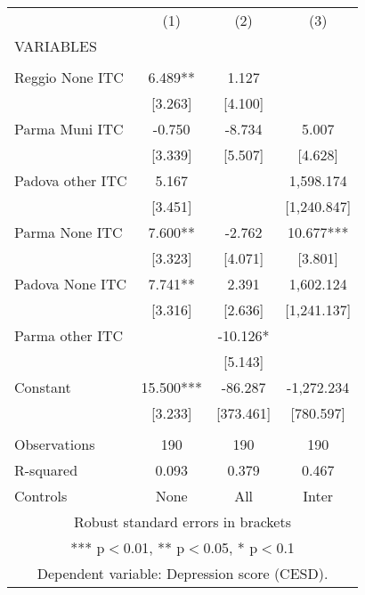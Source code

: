 \begin{tabular}{lccc} \hline
 & (1) & (2) & (3) \\
VARIABLES &  &  &  \\ \hline
 &  &  &  \\
Reggio None ITC & 6.489** & 1.127 &  \\
 & [3.263] & [4.100] &  \\
Parma Muni ITC & -0.750 & -8.734 & 5.007 \\
 & [3.339] & [5.507] & [4.628] \\
Padova other ITC & 5.167 &  & 1,598.174 \\
 & [3.451] &  & [1,240.847] \\
Parma None ITC & 7.600** & -2.762 & 10.677*** \\
 & [3.323] & [4.071] & [3.801] \\
Padova None ITC & 7.741** & 2.391 & 1,602.124 \\
 & [3.316] & [2.636] & [1,241.137] \\
Parma other ITC &  & -10.126* &  \\
 &  & [5.143] &  \\
Constant & 15.500*** & -86.287 & -1,272.234 \\
 & [3.233] & [373.461] & [780.597] \\
 &  &  &  \\
Observations & 190 & 190 & 190 \\
R-squared & 0.093 & 0.379 & 0.467 \\
 Controls & None & All & Inter \\ \hline
\multicolumn{4}{c}{ Robust standard errors in brackets} \\
\multicolumn{4}{c}{ *** p$<$0.01, ** p$<$0.05, * p$<$0.1} \\
\multicolumn{4}{c}{ Dependent variable: Depression score (CESD).} \\
\end{tabular}
